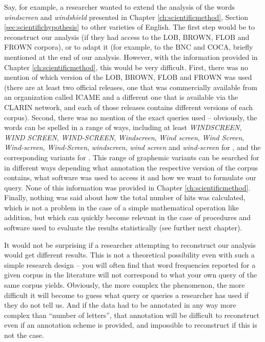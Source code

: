 Say, for example, a researcher wanted to extend the analysis of the words \textit{windscreen} and \textit{windshield} presented in Chapter \ref{ch:scientificmethod}, Section \ref{sec:scientifichypothesis} to other varieties of English. The first step would be to reconstruct our analysis (if they had access to the LOB, BROWN, FLOB and FROWN corpora), or to adapt it (for example, to the BNC and COCA, briefly mentioned at the end of our analysis. However, with the information provided in  Chapter \ref{ch:scientificmethod}, this would be very difficult. First, there was no mention of which version of the LOB, BROWN, FLOB and FROWN was used (there are at least two official releases, one that was commercially available from an organization called ICAME and a different one that is available via the CLARIN network, and each of those releases contains different versions of each corpus). Second, there was no mention of the exact queries used -- obviously, the words can be spelled in a range of ways, including at least \textit{WINDSCREEN}, \textit{WIND SCREEN}, \textit{WIND-SCREEN}, \textit{Windscreen}, \textit{Wind screen}, \textit{Wind Screen}, \textit{Wind-screen}, \textit{Wind-Screen}, \textit{windscreen}, \textit{wind screen} and \textit{wind-screen} for , and the corresponding variants for . This range of graphemic variants can be searched for in different ways depending what annotation the respective version of the corpus contains, what software was used to access it and how we want to formulate our query. None of this information was provided in Chapter \ref{ch:scientificmethod}. Finally, nothing was said about how the total number of hits was calculated, which is not a problem in the case of a simple mathematical operation like addition, but which can quickly become relevant in the case of procedures and software used to evaluate the results statistically (see further next chapter).

It would not be surprising if a researcher attempting to reconstruct our analysis would get different results. This is not a theoretical possibility even with such a simple research design -- you will often find that word frequencies reported for a given corpus in the literature will not correspond to what your own query of the same corpus yields. Obviously, the more complex the phenomenon, the more difficult it will become to guess what query or queries a researcher has used if they do not tell us. And if the data had to be annotated in any way more complex than ``number of letters'', that annotation will be difficult to reconstruct even if an annotation scheme is provided, and impossible to reconstruct if this is not the case.

